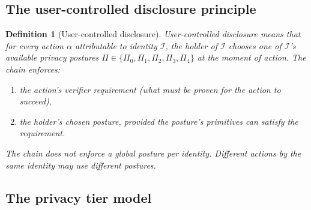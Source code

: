 \documentclass[11pt,a4paper,parskip=half-,DIV=12,headings=standardclasses]{scrartcl}
\theoremstyle{ncthm}
\theoremstyle{ncdef}
\newtheorem{definition}[theorem]{Definition}
\newcommand{\identity}{\mathcal{I}}
\begin{document}
\subsection{The user-controlled disclosure principle}

\begin{definition}[User-controlled disclosure]\label{def:user-controlled-disclosure}
\emph{User-controlled disclosure} means that for every action $\alpha$
attributable to identity $\identity$, the holder of $\identity$
chooses one of $\identity$'s available \emph{privacy postures}
$\Pi \in \{\Pi_0, \Pi_1, \Pi_2, \Pi_3, \Pi_4\}$ at the moment of
action. The chain enforces:
\begin{enumerate}
\item the action's verifier requirement (what must be proven for the
  action to succeed),
\item the holder's chosen posture, provided the posture's primitives
  can satisfy the requirement.
\end{enumerate}
The chain does not enforce a global posture per identity. Different
actions by the same identity may use different postures.
\end{definition}

\subsection{The privacy tier model}\label{sec:privacy-tiers}
\end{document}
